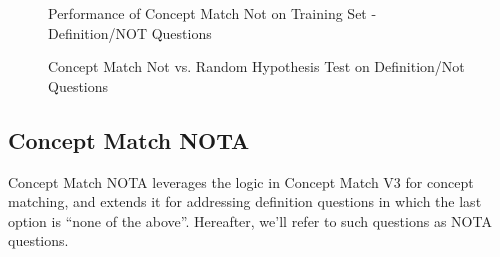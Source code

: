 \begin{figure}
\centering
\vspace{0.75in}
\caption{Performance of Concept Match Not on Training Set - Definition/NOT Questions}
\label{fig:concept_match_not_training_set_performance}
\end{figure}

\begin{figure}
\centering
\vspace{0.75in}
\caption{Concept Match Not vs. Random Hypothesis Test on Definition/Not Questions}
\label{fig:concept_match_not_hypothesis_test}
\end{figure}




\subsection{Concept Match NOTA}

Concept Match NOTA leverages the logic in Concept Match V3 for concept matching, and extends it for addressing definition questions in which the last option is ``none of the above''.  Hereafter, we'll refer to such questions as NOTA questions.

